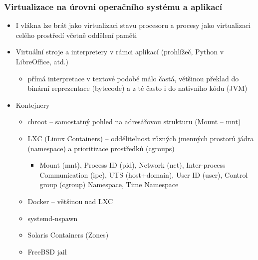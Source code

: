 \documentclass{beamer}
\begin{document}
\begin{frame}
\frametitle{Virtualizace na úrovni operačního systému a aplikací}

\begin{itemize}
 \item I vlákna lze brát jako virtualizaci stavu procesoru a procesy jako virtualizaci celého prostředí včetně oddělení paměti
 \item Virtuální stroje a interpretery v rámci aplikací (prohlížeč, Python v LibreOffice, atd.)
 \begin{itemize}
  \item přímá interpretace v textové podobě málo častá, většinou překlad do binární reprezentace (bytecode) a z té často i do nativního kódu (JVM)
 \end{itemize}
 \item Kontejnery
 \begin{itemize}
  \item chroot -- samostatný pohled na adresářovou strukturu (Mount -- mnt)
  \item LXC (Linux Containers) -- oddělitelnost různých jmenných prostorů jádra (namespace) a prioritizace prostředků (cgroups)
  \begin{itemize}
   \item Mount (mnt), Process ID (pid), Network (net), Inter-process Communication (ipc), UTS (host+domain), User ID (user), Control group (cgroup) Namespace, Time Namespace
  \end{itemize}
  \item Docker -- většinou nad LXC
  \item systemd-nspawn
  \item Solaris Containers (Zones)
  \item FreeBSD jail
 \end{itemize}
\end{itemize}
\end{frame}
\end{document}
